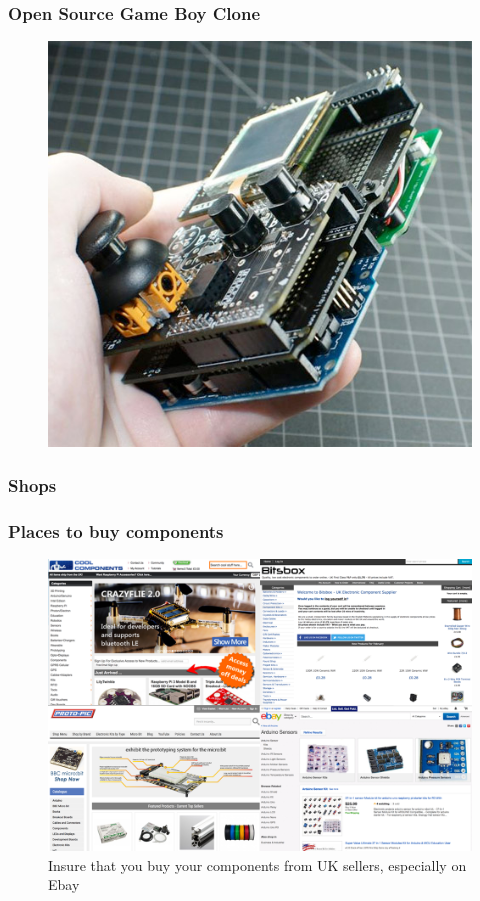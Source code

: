 \begin{frame}
	\frametitle{Open Source Game Boy Clone}
	\begin{figure}
		\includegraphics[scale=.32]{assets/gameboy} 
	\end{figure}
\end{frame}





\begin{frame}
	\frametitle{Shops}
	\frametitle{Places to buy components}
	\begin{figure}
		\includegraphics[scale=.25]{assets/shops} 
		\caption{Insure that you buy your components from UK sellers, especially on Ebay}
	\end{figure}
\end{frame}

